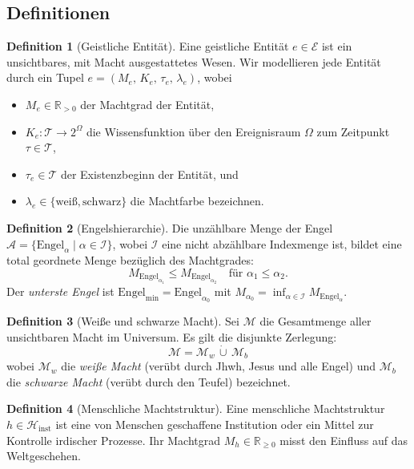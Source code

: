 ﻿\documentclass[a4paper,12pt]{article}
\theoremstyle{definition}
\newtheorem{definition}{Definition}
\begin{document}
\subsection{Definitionen}

\begin{definition}[Geistliche Entität]
  Eine geistliche Entität $e \in \mathcal{E}$ ist ein unsichtbares, mit Macht
  ausgestattetes Wesen. Wir modellieren jede Entität durch ein Tupel
  $e = (M_e,\, K_e,\, \tau_e,\, \lambda_e)$, wobei
  \begin{itemize}
    \item $M_e \in \mathbb{R}_{> 0}$ der Machtgrad der Entität,
    \item $K_e: \mathcal{T} \to 2^{\Omega}$ die Wissensfunktion über den Ereignisraum
          $\Omega$ zum Zeitpunkt $\tau \in \mathcal{T}$,
    \item $\tau_e \in \mathcal{T}$ der Existenzbeginn der Entität, und
    \item $\lambda_e \in \{\text{weiß}, \text{schwarz}\}$ die Machtfarbe bezeichnen.
  \end{itemize}
\end{definition}

\begin{definition}[Engelshierarchie]
  Die unzählbare Menge der Engel $\mathcal{A} = \{\mathrm{Engel}_\alpha \mid
  \alpha \in \mathcal{I}\}$, wobei $\mathcal{I}$ eine nicht abzählbare Indexmenge ist,
  bildet eine total geordnete Menge bezüglich des Machtgrades:
  \[
    M_{\mathrm{Engel}_{\alpha_1}} \leq M_{\mathrm{Engel}_{\alpha_2}}
    \quad \text{für } \alpha_1 \leq \alpha_2.
  \]
  Der \emph{unterste Engel} ist $\mathrm{Engel}_{\min} = \mathrm{Engel}_{\alpha_0}$
  mit $M_{\alpha_0} = \inf_{\alpha \in \mathcal{I}} M_{\mathrm{Engel}_\alpha}$.
\end{definition}

\begin{definition}[Weiße und schwarze Macht]
  Sei $\mathcal{M}$ die Gesamtmenge aller unsichtbaren Macht im Universum. Es gilt
  die disjunkte Zerlegung:
  \[
    \mathcal{M} = \mathcal{M}_w \,\dot{\cup}\, \mathcal{M}_b
  \]
  wobei $\mathcal{M}_w$ die \emph{weiße Macht} (verübt durch Jhwh, Jesus und alle
  Engel) und $\mathcal{M}_b$ die \emph{schwarze Macht} (verübt durch den Teufel)
  bezeichnet.
\end{definition}

\begin{definition}[Menschliche Machtstruktur]
  Eine menschliche Machtstruktur $h \in \mathcal{H}_{\text{inst}}$ ist eine von
  Menschen geschaffene Institution oder ein Mittel zur Kontrolle irdischer Prozesse.
  Ihr Machtgrad $M_h \in \mathbb{R}_{\geq 0}$ misst den Einfluss auf das Weltgeschehen.
\end{definition}
\end{document}
